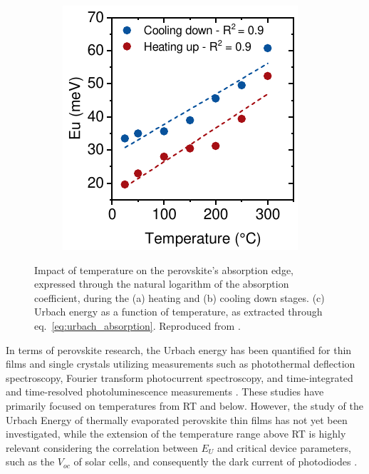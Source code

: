 \begin{figure}[htbp]
\begin{subfigure}{0.32\textwidth}
        \caption{}
        \label{fig:ellipsometry:urbach_cooling}
    \end{subfigure}
    \hfill
    \begin{subfigure}{0.3\textwidth}
        \includegraphics[width=\textwidth]{chapters/ellipsometry/image/Urbach_temp.pdf}
        \caption{}
        \label{fig:ellipsometry:urbach_temp}
    \end{subfigure}
    \caption[Impact of temperature on the perovskite's absorption edge during the heating and cooling down stages.]{Impact of temperature on the perovskite's absorption edge, expressed through the natural logarithm of the absorption coefficient, during the (a) heating and (b) cooling down stages. (c) Urbach energy as a function of temperature, as extracted through eq.~\ref{eq:urbach_absorption}. Reproduced from \cite{Papadopoulou2024InEllipsometry}.}
    \label{fig:ellipsometry:urbach}
\end{figure}

In terms of perovskite research, the Urbach energy has been quantified for thin films and single crystals utilizing measurements such as photothermal deflection spectroscopy, Fourier transform photocurrent spectroscopy, and time-integrated and time-resolved photoluminescence measurements \cite{Zhang2022UnravelingDisorder, Ledinsky2019TemperaturePerovskites, Singh2016EffectCH3NH3PbI3, DeWolf2014OrganometallicPerformance, Falsini2022AnalysisPerovskites}. These studies have primarily focused on temperatures from RT and below. However, the study of the Urbach Energy of thermally evaporated perovskite thin films has not yet been investigated, while the extension of the temperature range above RT is highly relevant considering the correlation between $E_U$ and critical device parameters, such as the $V_{oc}$ of solar cells, and consequently the dark current of photodiodes \cite{Ledinsky2019TemperaturePerovskites}.

